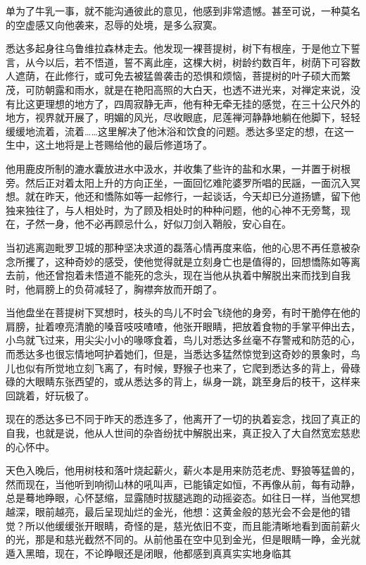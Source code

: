 \documentclass[12pt,twoside,openany]{book}
\begin{document}
单为了牛乳一事，就不能沟通彼此的意见，他感到非常遗憾。甚至可说，一种莫名的空虚感又向他袭来，忍辱的处境，是多么寂寞。

悉达多起身往乌鲁维拉森林走去。他发现一裸菩提树，树下有根座，于是他立下誓言，从今以后，若不悟道，誓不离此座，这棵大树，树龄约数百年，树荫下可容数人遮荫，在此修行，或可免去被猛兽袭击的恐惧和烦恼，菩提树的叶子硕大而繁茂，可防朝露和雨水，就是在艳阳高照的大白天，也透不进光来，对禅定来说，没有比这更理想的地方了，四周寂静无声，他有种无牵无挂的感觉，在三十公尺外的地方，视界就开展了，明媚的风光，尽收眼底，尼莲禅河静静地躺在他脚下，轻轻缓缓地流着，流着……这里解决了他沐浴和饮食的问题。悉达多坚定的想，在这一生中，这土地将是上苍赐给他的最后修道场了。

他用鹿皮所制的漉水囊放进水中汲水，并收集了些许的盐和水果，一并置于树根旁。然后正对着太阳上升的方向正坐，一面回忆难陀婆罗所唱的民謡，一面沉入冥想。就在昨天，他还和憍陈如等一起修行，一起谈话，今天却已分道扬镳，留下他独来独往了，与人相处时，为了顾及相处时的种种问题，他的心神不无旁鹜，现在，孑然一身，他不必再顾忌什么，好似刀剑入鞘般，安心自在。

当初逃离迦毗罗卫城的那种坚决求道的磊落心情再度来临，他的心思不再任意被杂念所攫了，这种奇妙的感受，使他觉得就是立刻身亡也是值得的，回想憍陈如等离去前，他还曾抱着未悟道不能死的念头，现在当他从执着中解脱出来而找到自我时，他肩膀上的负荷减轻了，胸襟奔放而开朗了。

当他盘坐在菩提树下冥想时，枝头的鸟儿不时会飞绕他的身旁，有时干脆停在他的肩膀，扯着嘹亮清脆的嗓音吱吱喳喳，他张开眼睛，把放着食物的手掌平伸出去，小鸟就飞过来，用尖尖小小的喙啄食着，鸟儿对悉达多丝毫不存警戒和防范的心，而悉达多也很忘情地呵护着她们，但是，当悉达多猛然惊觉到这奇妙的景象时，鸟儿也似有所觉地立刻飞离了，有时候，野猴子也来了，它爬到悉达多的背上，骨碌碌的大眼睛东张西望的，或从悉达多的背上，纵身一跳，跳至身后的枝干，这样来回跳着，好玩极了。

现在的悉达多已不同于昨天的悉连多了，他离开了一切的执着妄念，找回了真正的自我，也就是说，他从人世间的杂沓纷扰中解脱出来，真正投入了大自然宽宏慈悲的心怀中。

天色入晚后，他用树枝和落叶烧起薪火，薪火本是用来防范老虎、野狼等猛兽的，然而现在，当他听到响彻山林的吼叫声，已能镇定如恒，不再像从前，每有动静，总是蓦地睁眼，心怀瑟缩，显露随时拔腿逃跑的动摇姿态。如往日一样，当他冥想越深，眼前越亮，最后呈现灿烂的金光，他想：这黄金般的慈光会不会是他的错觉？所以他缓缓张开眼睛，奇怪的是，慈光依旧不变，而且能清晰地看到面前薪火的光，那是和慈光截然不同的。从前他虽在空中见到金光，但是眼睛一睁，金光就遁入黑暗，现在，不论睁眼还是闭眼，他都感到真真实实地身临其
\end{document}
